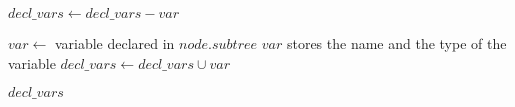 \begin{algorithmic}[1]

			\State $decl\_vars \leftarrow decl\_vars - var$		
		\EndIf
	\EndFor

		\State $var \leftarrow$ variable declared in $node.subtree$
		\Comment $var$ stores the name and the type of the variable
			\State $decl\_vars \leftarrow decl\_vars \cup var$		
		\EndIf
	\EndFor

	\Return $decl\_vars$
\EndProcedure
\end{algorithmic}